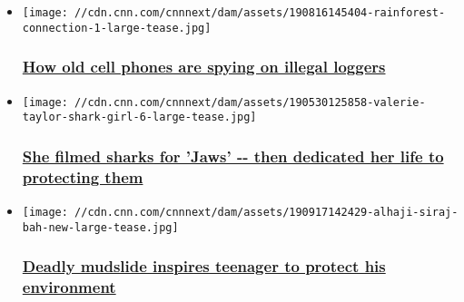 \begin{itemize}
\item
  \href{/2019/11/27/world/cell-phones-illegal-loggers-scn-intl-c2e/index.html}{}

  \texttt{[image: //cdn.cnn.com/cnnnext/dam/assets/190816145404-rainforest-connection-1-large-tease.jpg]}

  \hypertarget{how-old-cell-phones-are-spying-on-illegal-loggers-}{%
  \subsubsection{\texorpdfstring{\href{/2019/11/27/world/cell-phones-illegal-loggers-scn-intl-c2e/index.html}{How
  old cell phones are spying on illegal loggers
  }}{How old cell phones are spying on illegal loggers }}\label{how-old-cell-phones-are-spying-on-illegal-loggers-}}
\item
  \href{/2019/11/25/world/valerie-taylor-scn-intl-c2e/index.html}{}

  \texttt{[image: //cdn.cnn.com/cnnnext/dam/assets/190530125858-valerie-taylor-shark-girl-6-large-tease.jpg]}

  \hypertarget{she-filmed-sharks-for-jaws----then-dedicated-her-life-to-protecting-them}{%
  \subsubsection{\texorpdfstring{\href{/2019/11/25/world/valerie-taylor-scn-intl-c2e/index.html}{She
  filmed sharks for 'Jaws' -\/- then dedicated her life to protecting
  them}}{She filmed sharks for 'Jaws' -\/- then dedicated her life to protecting them}}\label{she-filmed-sharks-for-jaws----then-dedicated-her-life-to-protecting-them}}
\item
  \href{/2019/11/25/africa/sierra-leone-environment-intl-c2e/index.html}{}

  \texttt{[image: //cdn.cnn.com/cnnnext/dam/assets/190917142429-alhaji-siraj-bah-new-large-tease.jpg]}

  \hypertarget{deadly-mudslide-inspires-teenager-to-protect-his-environment}{%
  \subsubsection{\texorpdfstring{\href{/2019/11/25/africa/sierra-leone-environment-intl-c2e/index.html}{Deadly
  mudslide inspires teenager to protect his
  environment}}{Deadly mudslide inspires teenager to protect his environment}}\label{deadly-mudslide-inspires-teenager-to-protect-his-environment}}
\end{itemize}

